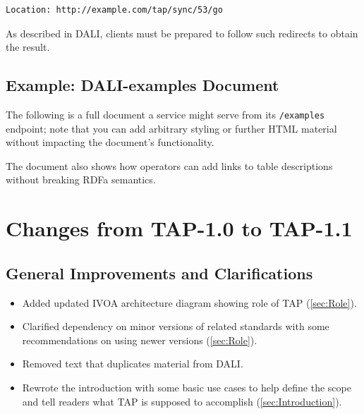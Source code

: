 \documentclass[11pt,letter]{ivoa}
\begin{document}
\begin{verbatim}
Location: http://example.com/tap/sync/53/go
\end{verbatim}

As described in DALI, clients must be prepared to follow such 
redirects to obtain the result.

\subsection{Example: DALI-examples Document}
\label{sec:example-example}

The following is a full document a service might serve from its
\verb|/examples| endpoint; note that you can add arbitrary styling or
further HTML material without impacting the document's functionality.

The document also shows how operators can add links to table
descriptions without breaking RDFa semantics.



\appendix

\section{Changes from TAP-1.0 to TAP-1.1}

\subsection{General Improvements and Clarifications}

\begin{itemize}

\item Added updated IVOA architecture diagram showing role of TAP  (\ref{sec:Role}). 

\item Clarified dependency on minor versions of related standards with some recommendations on
using newer versions (\ref{sec:Role}).

\item Removed text that duplicates material from DALI. 

\item Rewrote the introduction with some basic use cases to help define 
the scope and tell readers what TAP is supposed to accomplish (\ref{sec:Introduction}).

\end{itemize}
\end{document}
